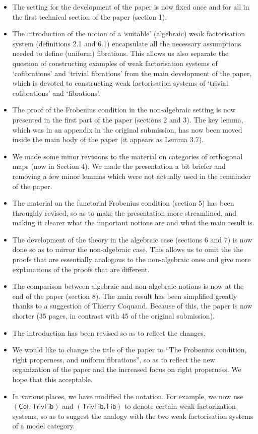\documentclass[reqno,10pt,a4paper,oneside,draft]{amsart}
\begin{document}
\begin{itemize}
\item The setting for the development of the paper is now fixed once and for all in the first technical section of the paper (section 1). 
\item The introduction of the notion of a `suitable' (algebraic) weak factorisation system (definitions 2.1 and 6.1) encapsulate all the necessary 
assumptions needed to define (uniform) fibrations. This allows us also separate the question of constructing examples of weak factorisation systems
of `cofibrations' and `trivial fibrations' from the main development of the paper, which is devoted to constructing weak factorisation systems of
`trivial cofibrations' and `fibrations'. 
\item The proof of the Frobenius condition in the non-algebraic setting is now presented in the first part of the paper (sections 2 and 3). 
The key lemma, which was in an appendix in the original submission, has now been moved inside the main body of the paper (it appears as Lemma 3.7). 
\item We made some minor revisions to the material on categories of orthogonal maps (now in Section 4). We made the presentation a bit briefer and removing a few minor 
lemmas which were not actually used  in the remainder of the paper.
\item The material on the functorial Frobenius condition (section 5) has been throughly revised, so as to make the presentation more streamlined, and making it 
clearer what the important notions are and what the main result is. 
\item The development of the theory in the algebraic case (sections 6 and 7) is now done so as to mirror the non-algebraic case. This allows us to omit the 
the proofs that are essentially analogous to the non-algebraic ones and give more explanations of the proofs that are different.
\item The comparison between algebraic and non-algebraic notions is now at the end of the paper (section 8). The main result has been simplified greatly thanks to a
suggestion of Thierry Coquand. Because of this, the paper is now shorter (35 pages, in contrast with 45 of the original submission).
\item The introduction  has been revised so as to reflect the changes. 
\item We would like  to change the title of the paper to ``The Frobenius condition, right properness, and uniform fibrations'', so as to reflect the new organization of
the paper and the increased focus on right properness. We hope that this acceptable.
\item In various places, we have modified the notation. For example, we now use $(\mathsf{Cof}, \mathsf{TrivFib})$ and $(\mathsf{TrivFib}, \mathsf{Fib})$ to denote
certain weak factorization systems, so as to suggest the analogy with the two weak factorisation systems of a model category.

\end{itemize}
\end{document}
